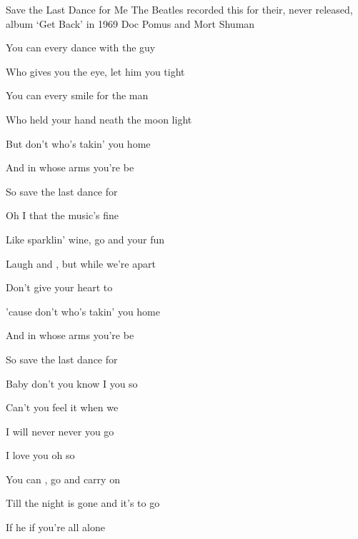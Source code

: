 \begin{SBSong}{Save the Last Dance for Me}
  {The Beatles recorded this for their, never released, album `Get Back' in 1969}
  {Doc Pomus and Mort Shuman}
  \begin{SBVerse}
    You can  every dance with the guy
  
    Who gives you the eye, let him  you tight 
  
    You can  every smile for the man
    
    Who held your hand neath the  moon light
    
    But don't  who's takin' you home
    
    And in whose arms you're  be
    
    So  save the last dance for  
  \end{SBVerse}
  \begin{SBVerse}
    Oh I  that the music's fine
    
    Like sparklin' wine, go and  your fun 
    
    Laugh and , but while we're apart
    
    Don't give your heart to 
    
    'cause don't  who's takin' you home
    
    And in whose arms you're  be
    
    So  save the last dance for   
  \end{SBVerse}
  \begin{SBVerse}
    Baby don't you know I  you so  
    
    Can't you feel it when we   
    
    I will never never  you go 
    
    I love you oh so  
  \end{SBVerse}
  \CBPageBrk
  \begin{SBVerse}
    You can , go and carry on
    
    Till the night is gone and it's  to go 
    
    If he  if you're all alone
    

\end{SBVerse}
\end{SBSong}
